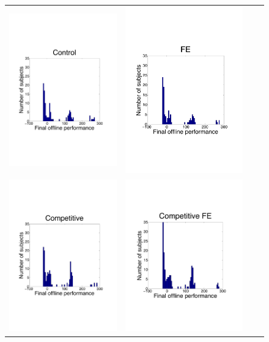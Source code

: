 \begin{figure}[htb]
\centering
\begin{tabular}{c c c c}
\includegraphics[width=0.35\columnwidth]{DistributionFinalOfflinePerformControl.pdf}&
\includegraphics[width=0.35\columnwidth]{DistributionFinalOfflinePerformFE.pdf}& \\
\includegraphics[width=0.35\columnwidth]{DistributionFinalOfflinePerformCompetitive.pdf}&
\includegraphics[width=0.35\columnwidth]{DistributionFinalOfflinePerformCompetitiveFE.pdf}

\end{tabular}
\end{figure}
